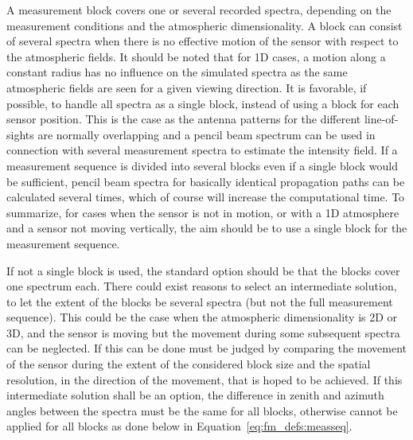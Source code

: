 A measurement block covers one or several recorded spectra, depending
on the measurement conditions and the atmospheric dimensionality. A
block can consist of several spectra when there is no effective motion
of the sensor with respect to the atmospheric fields. It should be
noted that for 1D cases, a motion along a constant radius has no
influence on the simulated spectra as the same atmospheric fields are
seen for a given viewing direction. It is favorable, if possible, to
handle all spectra as a single block, instead of using a block for
each sensor position. This is the case as the antenna patterns for the
different line-of-sights are normally overlapping and a pencil beam
spectrum can be used in connection with several measurement spectra to
estimate the intensity field. If a measurement sequence is divided
into several blocks even if a single block would be sufficient, pencil
beam spectra for basically identical propagation paths can be
calculated several times, which of course will increase the
computational time. To summarize, for cases when the sensor is not in
motion, or with a 1D atmosphere and a sensor not moving vertically,
the aim should be to use a single block for the measurement sequence.

If not a single block is used, the standard option should be that the
blocks cover one spectrum each. There could exist reasons to select an
intermediate solution, to let the extent of the blocks be several
spectra (but not the full measurement sequence). This could be the
case when the atmospheric dimensionality is 2D or 3D, and the sensor
is moving but the movement during some subsequent spectra can be
neglected. If this can be done must be judged by comparing the
movement of the sensor during the extent of the considered block
size and the spatial resolution, in the direction of the movement, that
is hoped to be achieved. If this intermediate solution shall be an
option, the difference in zenith and azimuth angles between the
spectra must be the same for all blocks, otherwise  cannot
be applied for all blocks as done below in Equation~\ref{eq:fm_defs:measseq}.

